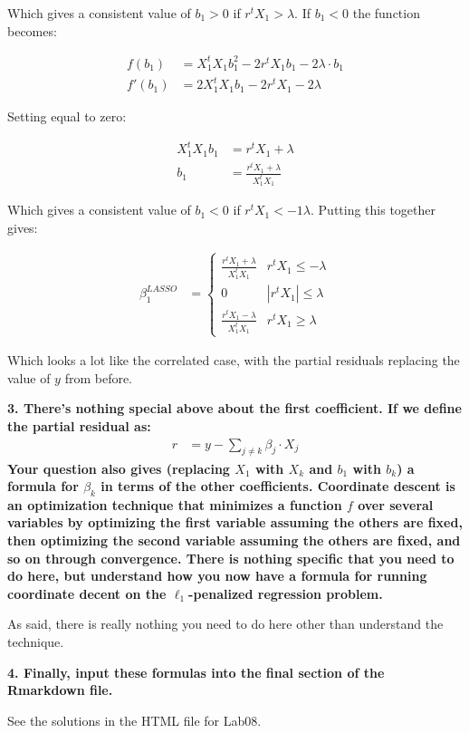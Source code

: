 \documentclass[12pt,hidelinks]{article}
\numberwithin{equation}{section}
\begin{document}
Which gives a consistent value of $b_1 > 0$ if $r^t X_1 > \lambda$. If
$b_1 < 0$ the function becomes:

\begin{align}
f(b_1) &= X_1^t X_1 b_1^2 - 2 r^t X_1 b_1 - 2 \lambda \cdot b_1 \\
f'(b_1) &= 2 X_1^t X_1 b_1 - 2 r^t X_1 - 2 \lambda
\end{align}

Setting equal to zero:

\begin{align}
X_1^t X_1 b_1 &= r^t X_1 + \lambda \\
b_1 &= \frac{r^t X_1 + \lambda}{ X_1^t X_1}
\end{align}

Which gives a consistent value of $b_1 < 0$ if $r^t X_1 < -1 \lambda$. Putting
this together gives:

\begin{align}
\beta^{LASSO}_1 &= \begin{cases} \frac{r^t X_1 + \lambda}{ X_1^t X_1} & r^t X_1 \leq -\lambda \\
                               0 & |r^t X_1| \leq \lambda \\
                               \frac{r^t X_1 - \lambda}{ X_1^t X_1} & r^t X_1 \geq \lambda \end{cases}
\end{align}

Which looks a lot like the correlated case, with the partial residuals replacing the
value of $y$ from before.

\vspace*{12pt}

\textbf{3. There's nothing special above about the first coefficient. If we define
the partial residual as:}
\begin{align}
r &= y - \sum_{j \neq k} \beta_j \cdot X_j
\end{align}
\textbf{Your question also gives (replacing $X_1$ with $X_k$ and $b_1$ with $b_k$) a
formula for $\beta_k$ in terms of the other coefficients. Coordinate descent
is an optimization technique that minimizes a function $f$ over several variables
by optimizing the first variable assuming the others are fixed, then optimizing
the second variable assuming the others are fixed, and so on through convergence.
There is nothing specific that you need to do here, but understand how you now
have a formula for running coordinate decent on the $\ell_1$-penalized regression
problem.}

\vspace*{12pt}

As said, there is really nothing you need to do here other than understand the
technique.

\vspace*{12pt}

\textbf{4. Finally, input these formulas into the final section of the Rmarkdown
file.}

\vspace*{12pt}

See the solutions in the HTML file for Lab08.
\end{document}
